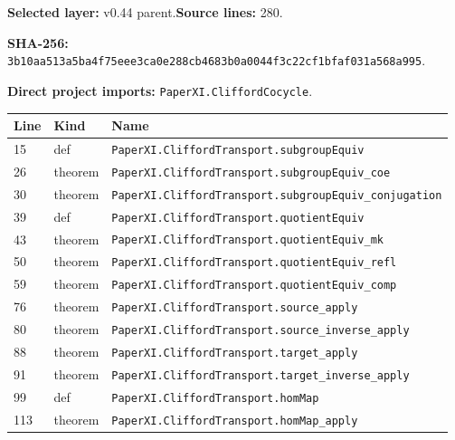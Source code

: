 \documentclass[10pt,oneside]{book}
\begin{document}
\textbf{Selected layer:} v0.44 parent.\quad\textbf{Source lines:} 280.\par\textbf{SHA-256:} {\scriptsize\nolinkurl{3b10aa513a5ba4f75eee3ca0e288cb4683b0a0044f3c22cf1bfaf031a568a995}}.


\textbf{Direct project imports:} \nolinkurl{PaperXI.CliffordCocycle}.

\begin{longtable}{@{}p{}p{}p{}@{}}\toprule Line&Kind&Name\\\midrule\endhead

15&def&\nolinkurl{PaperXI.CliffordTransport.subgroupEquiv}\\

26&theorem&\nolinkurl{PaperXI.CliffordTransport.subgroupEquiv_coe}\\

30&theorem&\nolinkurl{PaperXI.CliffordTransport.subgroupEquiv_conjugation}\\

39&def&\nolinkurl{PaperXI.CliffordTransport.quotientEquiv}\\

43&theorem&\nolinkurl{PaperXI.CliffordTransport.quotientEquiv_mk}\\

50&theorem&\nolinkurl{PaperXI.CliffordTransport.quotientEquiv_refl}\\

59&theorem&\nolinkurl{PaperXI.CliffordTransport.quotientEquiv_comp}\\

76&theorem&\nolinkurl{PaperXI.CliffordTransport.source_apply}\\

80&theorem&\nolinkurl{PaperXI.CliffordTransport.source_inverse_apply}\\

88&theorem&\nolinkurl{PaperXI.CliffordTransport.target_apply}\\

91&theorem&\nolinkurl{PaperXI.CliffordTransport.target_inverse_apply}\\

99&def&\nolinkurl{PaperXI.CliffordTransport.homMap}\\

113&theorem&\nolinkurl{PaperXI.CliffordTransport.homMap_apply}\\


\end{longtable}
\end{document}
